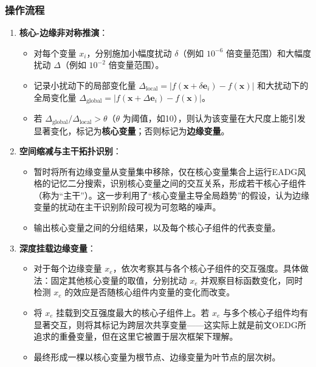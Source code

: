 \subsubsection{操作流程}
\begin{enumerate}
    \item \textbf{核心-边缘非对称推演}：
        \begin{itemize}
            \item 对每个变量 $x_i$，分别施加小幅度扰动 $\delta$（例如 $10^{-6}$ 倍变量范围）和大幅度扰动 $\Delta$（例如 $10^{-2}$ 倍变量范围）。
            \item 记录小扰动下的局部变化量 $\Delta_{\text{local}} = |f(\mathbf{x}+\delta\mathbf{e}_i) - f(\mathbf{x})|$ 和大扰动下的全局变化量 $\Delta_{\text{global}} = |f(\mathbf{x}+\Delta\mathbf{e}_i) - f(\mathbf{x})|$。
            \item 若 $\Delta_{\text{global}} / \Delta_{\text{local}} > \theta$（$\theta$ 为阈值，如10），则认为该变量在大尺度上能引发显著变化，标记为\textbf{核心变量}；否则标记为\textbf{边缘变量}。
        \end{itemize}
    \item \textbf{空间缩减与主干拓扑识别}：
        \begin{itemize}
            \item 暂时将所有边缘变量从变量集中移除，仅在核心变量集合上运行EADG风格的记忆二分搜索，识别核心变量之间的交互关系，形成若干核心子组件（称为“主干”）。这一步利用了“核心变量主导全局趋势”的假设，认为边缘变量的扰动在主干识别阶段可视为可忽略的噪声。
            \item 输出核心变量之间的分组结果，以及每个核心子组件的代表变量。
        \end{itemize}
    \item \textbf{深度挂载边缘变量}：
        \begin{itemize}
            \item 对于每个边缘变量 $x_e$，依次考察其与各个核心子组件的交互强度。具体做法：固定其他核心变量的取值，分别扰动 $x_e$ 并观察目标函数变化，同时检测 $x_e$ 的效应是否随核心组件内变量的变化而改变。
            \item 将 $x_e$ 挂载到交互强度最大的核心子组件上。若 $x_e$ 与多个核心子组件均有显著交互，则将其标记为跨层次共享变量——这实际上就是前文OEDG所追求的重叠变量，但在这里它被置于层次框架下理解。
            \item 最终形成一棵以核心变量为根节点、边缘变量为叶节点的层次树。
        \end{itemize}
\end{enumerate}

